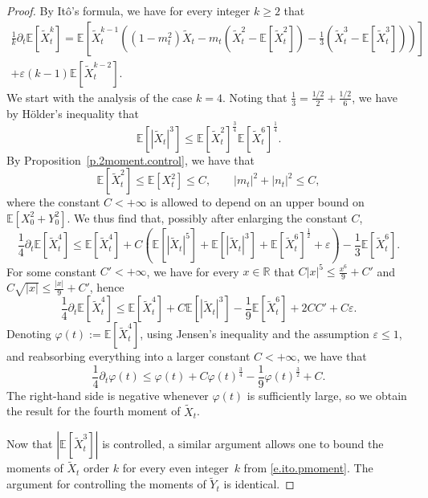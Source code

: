 \documentclass[11pt]{amsart}
\theoremstyle{remark}
\theoremstyle{definition}
\numberwithin{equation}{section}
\numberwithin{proposition}{section}
\newcommand{\R}{\mathbb{R}}
\newcommand{\ep}{\varepsilon}
\renewcommand{\le}{\leqslant}
\renewcommand{\ge}{\geqslant}
\newcommand{\td}{\widetilde}
\newcommand{\Ll}{\left}
\newcommand{\Rr}{\right}
\newcommand{\dr}{\partial}
\newcommand{\1}{\mathbf{1}}
\newcommand{\E}{\mathbb E}
\renewcommand{\phi}{\varphi}
\begin{document}
\begin{proof}
By It\^o's formula, we have for every integer $k \ge 2$ that
\begin{multline}  
\label{e.ito.pmoment}
\frac 1 k \dr_t \E[\td X_t^k] 
 = \E \Ll[\td X_t^{k-1}\Ll( (1-m_t^2) \td X_t -m_t \Ll(\td X_t^2 - \E[\td X_t^2] \Rr)
 - \frac 1 3 \Ll( \td X_t^3 - \E[\td X_t^3] \Rr)\Rr) \Rr] 
 \\ 
 + \ep (k-1) \E[\td X_t^{k-2}].
\end{multline}
We start with the analysis of the case $k = 4$. Noting that $\frac 1 3 = \frac{1/2}{2} + \frac{1/2}{6}$, we have by H\"older's inequality that
\begin{equation}  
\label{e.holder.326}
\E[|\td X_t|^3] \le \E[\td X_t^2]^{\frac 3 4} \E[\td X_t^6]^{\frac 1 4}.
\end{equation}
By Proposition~\ref{p.2moment.control}, we have that 
\begin{equation*}  %
\E[\td X_t^2] \le \E[X_t^2] \le C, \qquad |m_t|^2 + |n_t|^2 \le C,
\end{equation*}
where the constant $C < +\infty$ is allowed to depend on an upper bound on $\E[X_0^2+ Y_0^2]$. We thus find that, possibly after enlarging the constant $C$, 
\begin{equation*}  %
\frac 1 4 \dr_t \E[\td X_t^4] \le \E[\td X_t^4] + C \Ll( \E[|\td X_t|^5] +  \E[|\td X_t|^3] + \E[\td X_t^6]^\frac 1 2 + \ep \Rr) - \frac 1 3 \E[\td X_t^6] .
\end{equation*}
For some constant $C' < +\infty$, we have for every $x \in \R$ that $C |x|^5 \le \frac{x^6}{9} + C'$ and $C \sqrt{|x|} \le \frac {|x|}{9}+ C'$, hence 
\begin{equation*}  %
\frac 1 4 \dr_t \E[\td X_t^4] \le \E[\td X_t^4] + C \E[|\td X_t|^3] - \frac 1 9 \E[\td X_t^6] + 2CC' +  C \ep.
\end{equation*}
Denoting $\phi(t) := \E[\td X_t^4]$, using Jensen's inequality and the assumption $\ep \le 1$, and reabsorbing everything into a larger constant $C < +\infty$, we have that
\begin{equation*}  %
\frac 1 4 \dr_t \phi(t) \le \phi(t) + C \phi(t)^{\frac 3 4} - \frac 1 9 \phi(t)^{\frac 3 2} + C.
\end{equation*}
The right-hand side is negative whenever $\phi(t)$ is sufficiently large, so we obtain the result for the fourth moment of $\td X_t$. 

Now that $|\E[\td X_t^3]|$ is controlled, a similar argument allows one to bound the moments of $\td X_t$ order $k$ for every even integer~$k$ from \eqref{e.ito.pmoment}. The argument for controlling the moments of $\td Y_t$ is identical.
\end{proof}
\end{document}
